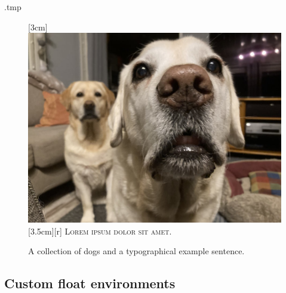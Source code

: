 \begin{VerbatimOut}{\jobname.tmp}
\begin{figure}
[3cm]{
  \includegraphics[bb=1cm 2cm 3cm 5cm, clip]
    {pictures/TheDogs.jpg}}
[3.5cm][r]{
  \scshape Lorem ipsum dolor sit amet.}

\caption{A collection of dogs and a typographical example sentence.}
\label{fig:subcaption}
\end{figure}
\end{VerbatimOut}
\ExecuteExample


%
%
\subsection{Custom float environments}\label{sec:custom floats}


